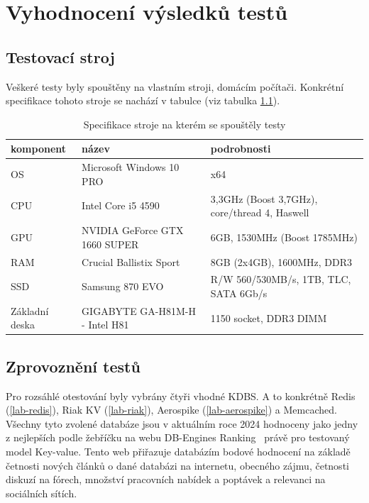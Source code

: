 \documentclass[czech,master,dept460,male,csharp,cpdeclaration]{diploma}
\begin{document}
	\chapter{Vyhodnocení výsledků testů\label{chapter:4-test_results}}
	
	\section{Testovací stroj}
	
	Veškeré testy byly spouštěny na vlastním stroji, domácím počítači. Konkrétní specifikace tohoto stroje se nachází v tabulce  (viz tabulka \ref{tab_my_pc_spec}). 
	
	\begin{table}
	\centering
	\caption{Specifikace stroje na kterém se spouštěly testy\label{tab_my_pc_spec}}
		\begin{tabular}{ l | l | l } 
			\toprule
			komponent & název & podrobnosti \\
			\midrule
			OS & Microsoft Windows 10 PRO & x64 \\
			CPU & Intel Core i5 4590 & 3,3GHz (Boost 3,7GHz), core/thread 4, Haswell\\
			GPU & NVIDIA GeForce GTX 1660 SUPER & 6GB, 1530MHz (Boost 1785MHz) \\
			RAM & Crucial Ballistix Sport & 8GB (2x4GB), 1600MHz, DDR3 \\
			SSD & Samsung 870 EVO & R/W 560/530MB/s, 1TB, TLC, SATA 6Gb/s \\
			Základní deska & GIGABYTE GA-H81M-H - Intel H81 & 1150 socket, DDR3 DIMM \\
			\bottomrule
		\end{tabular}
	\end{table}

	\section{Zprovoznění testů}
	
	Pro rozsáhlé otestování byly vybrány čtyři vhodné KDBS. A to konkrétně Redis (\ref{lab-redis}), Riak KV (\ref{lab-riak}), Aerospike (\ref{lab-aerospike}) a Memcached. Všechny tyto zvolené databáze jsou v aktuálním roce 2024 hodnoceny jako jedny z nejlepších podle žebříčku na webu DB-Engines Ranking~\cite{db-engineers-ranking} právě pro testovaný model Key-value. Tento web přiřazuje databázím bodové hodnocení na základě četnosti nových článků o dané databázi na internetu, obecného zájmu, četnosti diskuzí na fórech, množství pracovních nabídek a poptávek a relevanci na sociálních sítích.
	
\end{document}
